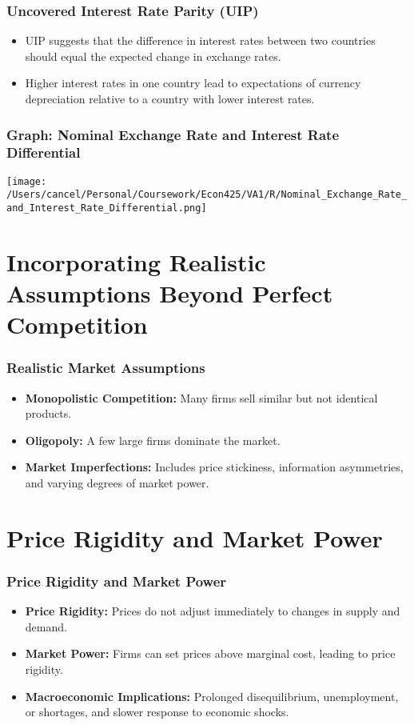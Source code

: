\documentclass{beamer}
\begin{document}
\begin{frame}
    \frametitle{Uncovered Interest Rate Parity (UIP)}
    \begin{itemize}
        \item UIP suggests that the difference in interest rates between two countries should equal the expected change in exchange rates.
        \item Higher interest rates in one country lead to expectations of currency depreciation relative to a country with lower interest rates.
    \end{itemize}
\end{frame}

\begin{frame}
    \frametitle{Graph: Nominal Exchange Rate and Interest Rate Differential}
    \begin{center}
        \texttt{[image: /Users/cancel/Personal/Coursework/Econ425/VA1/R/Nominal\_Exchange\_Rate\_and\_Interest\_Rate\_Differential.png]}
    \end{center}
\end{frame}

\section{Incorporating Realistic Assumptions Beyond Perfect Competition}
\begin{frame}
    \frametitle{Realistic Market Assumptions}
    \begin{itemize}
        \item \textbf{Monopolistic Competition:} Many firms sell similar but not identical products.
        \item \textbf{Oligopoly:} A few large firms dominate the market.
        \item \textbf{Market Imperfections:} Includes price stickiness, information asymmetries, and varying degrees of market power.
    \end{itemize}
\end{frame}

\section{Price Rigidity and Market Power}
\begin{frame}
    \frametitle{Price Rigidity and Market Power}
    \begin{itemize}
        \item \textbf{Price Rigidity:} Prices do not adjust immediately to changes in supply and demand.
        \item \textbf{Market Power:} Firms can set prices above marginal cost, leading to price rigidity.
        \item \textbf{Macroeconomic Implications:} Prolonged disequilibrium, unemployment, or shortages, and slower response to economic shocks.
    \end{itemize}
\end{frame}
\end{document}
